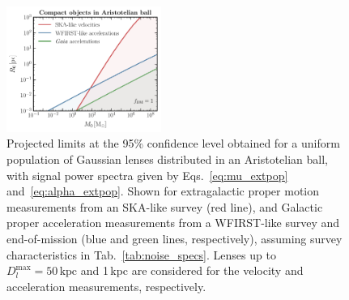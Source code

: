 \documentclass[prd,aps,twocolumn,nofootinbib,superscriptaddress,preprintnumbers,balancelastpage,longbibliography,floatfix]{revtex4-1}
\begin{document}
\begin{figure}[htbp]
\centering
\includegraphics[width=0.45\textwidth]{plots/compact_M_vs_R_aristotelian.pdf}
\caption{Projected limits at the 95\% confidence level obtained for a uniform population of Gaussian lenses distributed in an Aristotelian ball, with signal power spectra given by Eqs.~\eqref{eq:mu_extpop} and~\eqref{eq:alpha_extpop}. Shown for extragalactic proper motion measurements from an SKA-like survey (red line), and Galactic proper acceleration measurements from a WFIRST-like survey and end-of-mission \Gaia (blue and green lines, respectively), assuming survey characteristics in Tab.~\ref{tab:noise_specs}. Lenses up to $D_l^{\mathrm{max}} = 50\,\mathrm{kpc}$ and 1\,kpc are considered for the velocity and acceleration measurements, respectively. } 
\label{fig:compact_sens_arist}
\end{figure}
\end{document}
